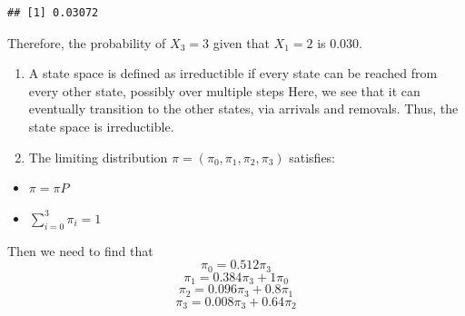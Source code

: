 \documentclass[
]{article}
\begin{document}
\begin{verbatim}
## [1] 0.03072
\end{verbatim}

Therefore, the probability of \(X_3 = 3\) given that \(X_1 = 2\) is
0.030.

\begin{enumerate}
\def\labelenumi{(\alph{enumi})}
\setcounter{enumi}{2}
\item
  A state space is defined as irreductible if every state can be reached
  from every other state, possibly over multiple steps Here, we see that
  it can eventually transition to the other states, via arrivals and
  removals. Thus, the state space is irreductible.
\item
  The limiting distribution \(\pi = (\pi_0, \pi_1, \pi_2, \pi_3)\)
  satisfies:
\end{enumerate}

\begin{itemize}
\item
  \(\pi = \pi P\)
\item
  \(\sum_{i=0}^{3} \pi_i = 1\)
\end{itemize}

Then we need to find that \[\pi_0 = 0.512\pi_3\]
\[\pi_1 = 0.384\pi_3 + 1\pi_0\] \[\pi_2 = 0.096\pi_3 + 0.8\pi_1\]
\[\pi_3 = 0.008\pi_3 + 0.64\pi_2\]
\end{document}
